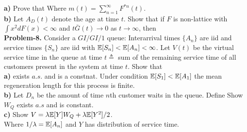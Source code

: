 \documentclass[letterpaper,english,10pt]{article}
\begin{document}
\textbf{a)} Prove that
Where $m(t) = \sum_{n=1}^\infty F^{*n}(t)$.\\
\textbf{b)} Let $A_D(t)$ denote the age at time $t$. Show that if $F$ is non-lattice with $\int x^2 dF(x) < \infty$ and $t \bar{G}(t) \to 0$ as $t \to \infty$, then
\\
\textbf{Problem-8.}
Consider a $GI/GI/1$ queue: Interarrival times $\{ A_n \}$ are iid and service times $\{ S_n \}$ are iid with $\mathbb{E}[S_n] < \mathbb{E}[A_n] < \infty$. Let $V(t)$ be the virtual service time in the queue at time $t \triangleq$ sum of the remaining service time of all customers present in the system at time $t$. Show that\\
\textbf{a)} 
exists $a.s.$ and is a constnat. Under condition $\mathbb{E} [S_1] < \mathbb{E} [A_1]$ the mean regeneration length for this process is finite.\\
\textbf{b)} Let $D_n$ be the amount of time $n$th customer waits in the queue.
Define
Show $W_Q$ exists $a.s$ and is constant.\\
\textbf{c)} Show $V = \lambda \mathbb{E}[Y] W_Q + \lambda \mathbb{E}[Y^2]/2$.\\
Where $1/\lambda = \mathbb{E}[A_n]$ and $Y$ has distribution of service time.
\\
\end{document}
